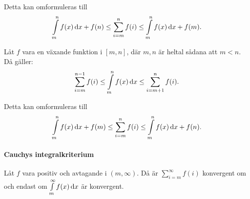 Detta kan omformuleras till
\begin{align*}
	\int\limits_{m}^{n}f(x)\dd{x} + f(n)\leq \sum\limits_{i = m}^{n}f(i)\leq \int\limits_{m}^{n}f(x)\dd{x} + f(m).
\end{align*}

Låt $f$ vara en växande funktion i $[m, n]$, där $m, n$ är heltal sådana att $m < n$. Då gäller:
\begin{align*}
	\sum\limits_{i = m}^{n - 1}f(i)\leq \int\limits_{m}^{n}f(x)\dd{x}\leq \sum\limits_{i = m + 1}^{n}f(i).
\end{align*}

Detta kan omformuleras till
\begin{align*}
	\int\limits_{m}^{n}f(x)\dd{x} + f(m)\leq \sum\limits_{i = m}^{n}f(i)\leq \int\limits_{m}^{n}f(x)\dd{x} + f(n).
\end{align*}

\paragraph{Cauchys integralkriterium}
Låt $f$ vara positiv och avtagande i $(m, \infty)$. Då är $\sum\limits_{i = m}^{\infty}f(i)$ konvergent om och endast om $\int\limits_{m}^{\infty}f(x)\dd{x}$ är konvergent.